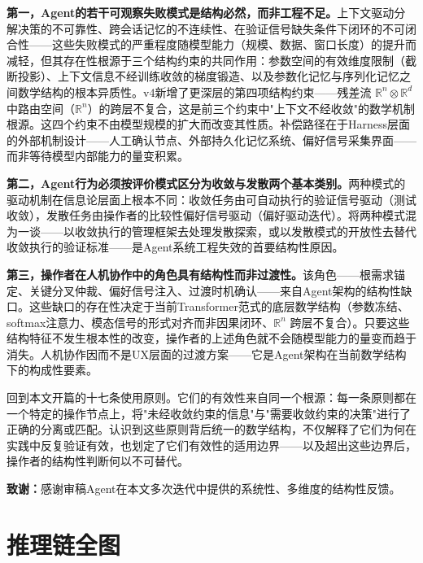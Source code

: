 \documentclass[11pt,a4paper]{article}
\theoremstyle{definition}
\begin{document}
\textbf{第一，Agent的若干可观察失败模式是结构必然，而非工程不足。}上下文驱动分解决策的不可靠性、跨会话记忆的不连续性、在验证信号缺失条件下闭环的不可闭合性——这些失败模式的严重程度随模型能力（规模、数据、窗口长度）的提升而减轻，但其存在性根源于三个结构约束的共同作用：参数空间的有效维度限制（截断投影）、上下文信息不经训练收敛的梯度锻造、以及参数化记忆与序列化记忆之间数学结构的根本异质性。v4新增了更深层的第四项结构约束——残差流 $\mathbb{R}^n \otimes \mathbb{R}^d$ 中路由空间（$\mathbb{R}^n$）的跨层不复合，这是前三个约束中"上下文不经收敛"的数学机制根源。这四个约束不由模型规模的扩大而改变其性质。补偿路径在于Harness层面的外部机制设计——人工确认节点、外部持久化记忆系统、偏好信号采集界面——而非等待模型内部能力的量变积累。

\textbf{第二，Agent行为必须按评价模式区分为收敛与发散两个基本类别。}两种模式的驱动机制在信息论层面上根本不同：收敛任务由可自动执行的验证信号驱动（测试收敛），发散任务由操作者的比较性偏好信号驱动（偏好驱动迭代）。将两种模式混为一谈——以收敛执行的管理框架去处理发散探索，或以发散模式的开放性去替代收敛执行的验证标准——是Agent系统工程失效的首要结构性原因。

\textbf{第三，操作者在人机协作中的角色具有结构性而非过渡性。}该角色——根需求锚定、关键分叉仲裁、偏好信号注入、过渡时机确认——来自Agent架构的结构性缺口。这些缺口的存在性决定于当前Transformer范式的底层数学结构（参数冻结、softmax注意力、模态信号的形式对齐而非因果闭环、$\mathbb{R}^n$ 跨层不复合）。只要这些结构特征不发生根本性的改变，操作者的上述角色就不会随模型能力的量变而趋于消失。人机协作因而不是UX层面的过渡方案——它是Agent架构在当前数学结构下的构成性要素。

回到本文开篇的十七条使用原则。它们的有效性来自同一个根源：每一条原则都在一个特定的操作节点上，将"未经收敛约束的信息"与"需要收敛约束的决策"进行了正确的分离或匹配。认识到这些原则背后统一的数学结构，不仅解释了它们为何在实践中反复验证有效，也划定了它们有效性的适用边界——以及超出这些边界后，操作者的结构性判断何以不可替代。

\noindent\textbf{致谢：}感谢审稿Agent在本文多次迭代中提供的系统性、多维度的结构性反馈。

\appendix

\section{推理链全图}
\end{document}
